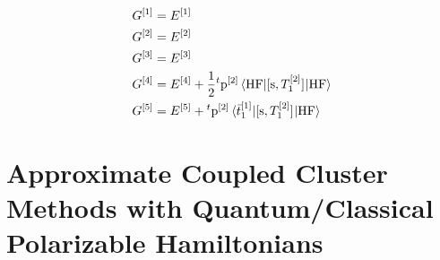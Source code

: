 \begin{subequations}
  \begin{align}
    G^{[1]} &= E^{[1]} \label{eq:ptes-mbpt-1st} \\
    G^{[2]} &= E^{[2]} \label{eq:ptes-mbpt-2nd} \\
    G^{[3]} &= E^{[3]} \label{eq:ptes-mbpt-3rd} \\
    G^{[4]} &= E^{[4]} + \frac{1}{2}
    {}^t\mathrm{p}^{[2]}\braket{\mathrm{HF} | [ \mathrm{s}, T_1^{[2]} ]^{}
    |\mathrm{HF}} \label{eq:ptes-mbpt-4th} \\
    G^{[5]} &= E^{[5]}
    + {}^t\mathrm{p}^{[2]}\braket{\bar{t}_{1}^{[1]} | [ \mathrm{s}, T_1^{[2]} ]^{}
    \label{eq:ptes-mbpt-5th}
    |\mathrm{HF}}
  \end{align}
\end{subequations}

\section[Approximate Coupled Cluster Methods]{
Approximate Coupled Cluster Methods with Quantum/Classical Polarizable Hamiltonians
}\label{sec:cc-approximate-quantum-classical}

